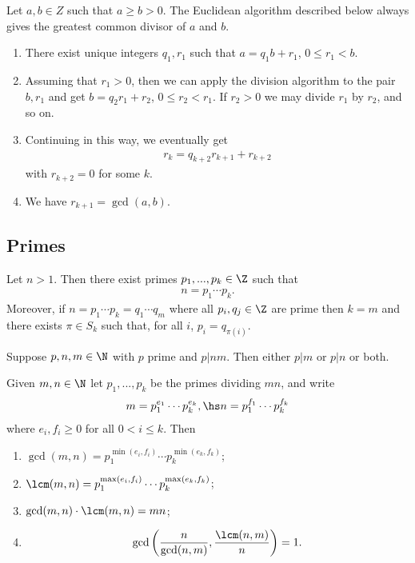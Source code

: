 \documentclass{article}
\begin{document}
\begin{theorem}
	Let $a,b\in Z$ such that $a\geq b>0$.
	The Euclidean algorithm described below always gives the greatest common divisor of
	$a$ and $b$.
	\begin{enumerate}
		\item There exist unique integers $q_1,r_1$ such that $a=q_1b+r_1$, $0\leq r_1<b$.
		\item Assuming that $r_1>0$, then we can apply the division algorithm to the pair
		      $b,r_1$ and get $b=q_2r_1 + r_2$, $0\leq r_2<r_1$. If $r_2>0$ we may divide
		      $r_1$ by $r_2$, and so on.
		\item Continuing in this way, we eventually get \begin{align*}
			      r_k=q_{k+2}r_{k+1}+r_{k+2}
		      \end{align*}
		      with $r_{k+2}=0$ for some $k$.
		\item We have $r_{k+1}=\gcd(a,b)$.
	\end{enumerate}
\end{theorem}

\subsection{Primes}

\begin{theorem}
	Let $n>1$. Then there exist primes $p_1,...,p_k\in\Z$ such that
	\begin{align*}
		n=p_1\cdots p_k.
	\end{align*}
	Moreover, if $n=p_1\cdots p_k=q_1\cdots q_m$ where all $p_i,q_j\in\Z$ are prime
	then $k=m$ and there exists $\pi\in S_k$ such that, for all $i$, $p_i=q_{\pi(i)}$.
\end{theorem}

\begin{proposition}[Boocher 2.3]
	Suppose $p,n,m\in\N$ with $p$ prime and $p|nm$. Then either $p|m$ or $p|n$ or both.
\end{proposition}

\begin{proposition}[Boocher 3.2]
	Given $m,n\in\N$ let $p_1,...,p_k$ be the primes dividing $mn$, and write
	\begin{align*}
		m = p_1^{e_1}\cdots p_k^{e_k}, \hs n = p_1^{f_1}\cdots p_k^{f_k}
	\end{align*}
	where $e_i,f_i\geq 0$ for all $0<i\leq k$. Then
	\begin{enumerate}
		\item $\gcd(m,n)=p_1^{\min(e_i,f_i)}\cdots p_k^{\min(e_k,f_k)}$;
		\item $\lcm(m,n)=p_1^{\max(e_i,f_i)}\cdots p_k^{\max(e_k,f_k)}$;
		\item $\gcd(m,n)\cdot\lcm(m,n)=mn$;
		\item \begin{align*}
			      \gcd\left(\frac{n}{\gcd(n,m)},\frac{\lcm(n,m)}{n}\right)=1.
		      \end{align*}
	\end{enumerate}
\end{proposition}
\end{document}
